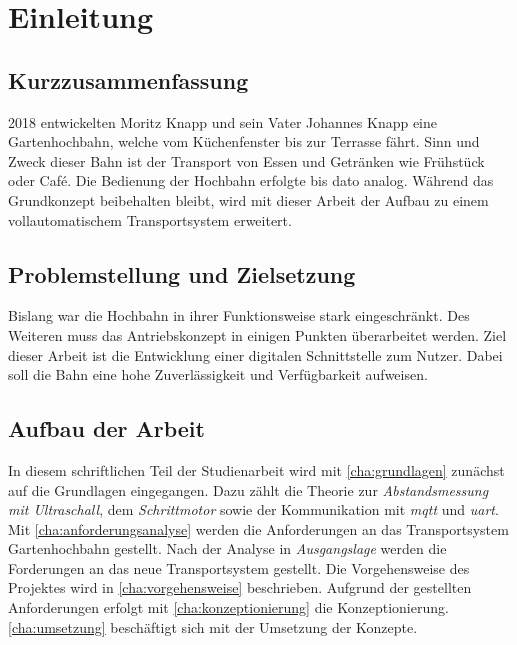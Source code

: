 
\chapter{Einleitung}

\section{Kurzzusammenfassung}
2018 entwickelten Moritz Knapp und sein Vater Johannes Knapp eine Gartenhochbahn, welche vom Küchenfenster bis zur Terrasse fährt. 
Sinn und Zweck dieser Bahn ist der Transport von Essen und Getränken wie Frühstück oder Café. Die Bedienung der Hochbahn erfolgte bis dato analog. Während das Grundkonzept beibehalten bleibt, wird mit dieser Arbeit der Aufbau zu einem vollautomatischem Transportsystem erweitert.

\section{Problemstellung und Zielsetzung}
    
Bislang war die Hochbahn in ihrer Funktionsweise stark eingeschränkt. Des Weiteren muss das Antriebskonzept in einigen Punkten überarbeitet werden. Ziel dieser Arbeit ist die Entwicklung einer digitalen Schnittstelle zum Nutzer. Dabei soll die Bahn eine hohe Zuverlässigkeit und Verfügbarkeit aufweisen. 
\newpage

\section{Aufbau der Arbeit}
In diesem schriftlichen Teil der Studienarbeit wird mit \autoref{cha:grundlagen} zunächst auf die Grundlagen eingegangen. Dazu zählt die Theorie zur \textit{Abstandsmessung mit Ultraschall}, dem \textit{Schrittmotor} sowie der Kommunikation mit \textit{\acrshort{mqtt}} und \textit{\acrshort{uart}}. 
Mit \autoref{cha:anforderungsanalyse} werden die Anforderungen an das Transportsystem Gartenhochbahn gestellt. Nach der Analyse in \textit{Ausgangslage} werden die Forderungen an das neue Transportsystem gestellt. Die Vorgehensweise des Projektes wird in \autoref{cha:vorgehensweise} beschrieben. Aufgrund der gestellten Anforderungen erfolgt mit \autoref{cha:konzeptionierung} die Konzeptionierung. \autoref{cha:umsetzung} beschäftigt sich mit der Umsetzung der Konzepte. 
 




